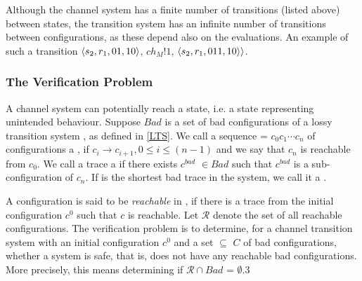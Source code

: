 Although the channel system has a finite number of transitions (listed above) between states, the transition system has an infinite number of transitions between configurations, as these depend also on the evaluations. An example of such a transition $\langle s_2,r_1,01,10\rangle$, $ch_M!1$, $\langle s_2,r_1,011,10\rangle\rangle$.

\subsubsection{The Verification Problem}
A channel system can potentially reach a  state, i.e. a state representing unintended behaviour. Suppose $Bad$ is a set of bad configurations of a lossy transition system , as defined in \ref{LTS}. We call a sequence  = $c_0c_1\cdots c_n$ of configurations a , if $c_i \rightarrow c_{i+1}, 0 \leq i \leq (n-1)$ and we say that $c_n$ is reachable from $c_0$. We call a trace a  if there exists $c^{bad}$ $\in Bad$ such that $c^{bad}$ is a sub-configuration of $c_n$. If  is the shortest bad trace in the system, we call it a .

A configuration  is said to be \emph{reachable} in , if there is a trace from the initial configuration $c^0$ such that $c$ is reachable. Let $\mathcal{R}$ denote the set of all reachable configurations. The verification problem is to determine, for a channel transition system  with an initial configuration $c^0$ and a set  $\subseteq$ $C$ of bad configurations, whether a system is safe, that is, does not have any reachable bad configurations. More precisely, this means determining if $\mathcal{R} \cap Bad$ = $\emptyset$.3

